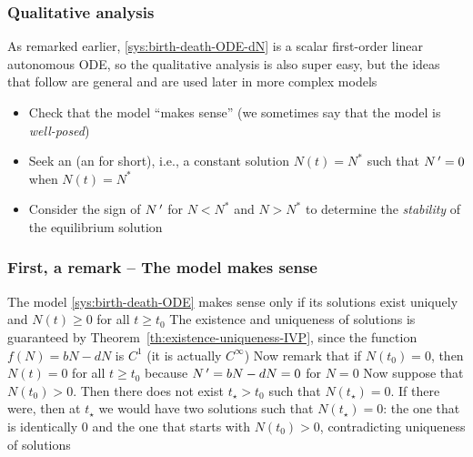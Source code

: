 \documentclass[aspectratio=169]{beamer}
\begin{document}
\begin{frame}\frametitle{Qualitative analysis}
As remarked earlier, \eqref{sys:birth-death-ODE-dN} is a scalar first-order linear autonomous ODE, so the qualitative analysis is also super easy, but the ideas that follow are general and are used later in more complex models
\vfill
\begin{itemize}
\item Check that the model ``makes sense'' (we sometimes say that the model is \emph{well-posed})
\item Seek an  (an  for short), i.e., a constant solution $N(t)=N^*$ such that $N\,'=0$ when $N(t)=N^*$
\item Consider the sign of $N\,'$ for $N<N^*$ and $N>N^*$ to determine the \emph{stability} of the equilibrium solution
\end{itemize}
\end{frame}

\begin{frame}\frametitle{First, a remark -- The model makes sense}
The model \eqref{sys:birth-death-ODE} makes sense only if its solutions exist uniquely and $N(t)\geq 0$ for all $t\geq t_0$
\vfill
The existence and uniqueness of solutions is guaranteed by Theorem~\ref{th:existence-uniqueness-IVP}, since the function $f(N)=bN-dN$ is $C^1$ (it is actually $C^\infty$)
\vfill
Now remark that if $N(t_0)=0$, then $N(t)=0$ for all $t\geq t_0$ because $N\,'=bN-dN=0$ for $N=0$
\vfill
Now suppose that $N(t_0)>0$. Then there does not exist $t_\star>t_0$ such that $N(t_\star)=0$. 
If there were, then at $t_\star$ we would have two solutions such that $N(t_\star)=0$: the one that is identically 0 and the one that starts with $N(t_0)>0$, contradicting uniqueness of solutions
\end{frame}


\begin{frame}
\begin{center}
\end{center}  
\end{frame}
\end{document}
